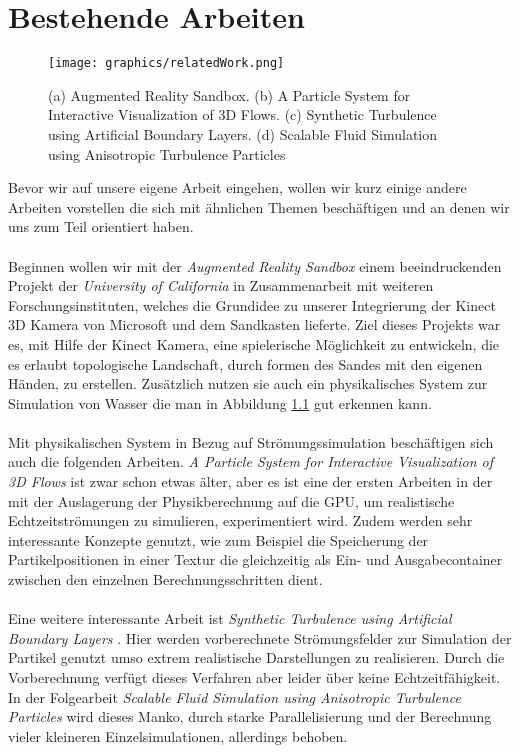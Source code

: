 \chapter{Bestehende Arbeiten}
\begin{Spacing}{\mylinespace}
\begin{figure}[h!]
	\centering
	\texttt{[image: graphics/relatedWork.png]}
	\caption{(a) Augmented Reality Sandbox. (b) A Particle System
for Interactive Visualization of 3D Flows. (c) Synthetic Turbulence using Artificial Boundary Layers. (d) Scalable Fluid Simulation using Anisotropic Turbulence Particles}
	\label{fig:relatedWork}
\end{figure}
Bevor wir auf unsere eigene Arbeit eingehen, wollen wir kurz einige andere Arbeiten vorstellen die sich mit ähnlichen Themen beschäftigen und an denen wir uns zum Teil orientiert haben.
\\\\
Beginnen wollen wir mit der \textit{Augmented Reality Sandbox} \cite{Kre10} einem beeindruckenden Projekt der \textit{University of California} in Zusammenarbeit mit weiteren Forschungsinstituten, welches die Grundidee zu unserer Integrierung der Kinect 3D Kamera von Microsoft und dem Sandkasten lieferte. Ziel dieses Projekts war es, mit Hilfe der Kinect Kamera, eine spielerische Möglichkeit zu entwickeln, die es erlaubt topologische Landschaft, durch formen des Sandes mit den eigenen Händen, zu erstellen. Zusätzlich nutzen sie auch ein physikalisches System zur Simulation von Wasser die man in Abbildung \ref{fig:relatedWork} gut erkennen kann.
\\\\
Mit physikalischen System in Bezug auf Strömungssimulation beschäftigen sich auch die folgenden Arbeiten. \textit{A Particle System
for Interactive Visualization of 3D Flows} \cite{Kru05} ist zwar schon etwas älter, aber es ist eine der ersten Arbeiten in der mit der Auslagerung der Physikberechnung auf die GPU, um realistische Echtzeitströmungen zu simulieren, experimentiert wird. Zudem werden sehr interessante Konzepte genutzt, wie zum Beispiel die Speicherung der Partikelpositionen in einer Textur die gleichzeitig als Ein- und Ausgabecontainer zwischen den einzelnen Berechnungsschritten dient.
\\\\
Eine weitere interessante Arbeit ist \textit{Synthetic Turbulence using Artificial Boundary Layers} \cite{Pfa09}. Hier werden vorberechnete Strömungsfelder zur Simulation der Partikel genutzt umso extrem realistische Darstellungen zu realisieren. Durch die Vorberechnung verfügt dieses Verfahren aber leider über keine Echtzeitfähigkeit. In der Folgearbeit \textit{Scalable Fluid Simulation using Anisotropic Turbulence Particles} \cite{Pfa10} wird dieses Manko, durch starke Parallelisierung und der Berechnung vieler kleineren Einzelsimulationen, allerdings behoben.



\end{Spacing}
\newpage
\clearpage
